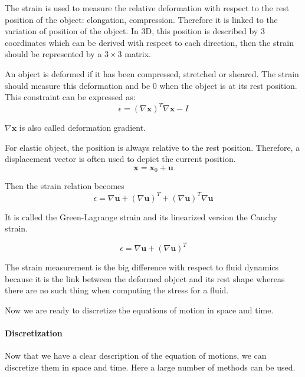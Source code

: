 \documentclass[11pt, oneside, a4paper]{memoir}
\begin{document}
The strain is used to measure the relative deformation with respect to the rest position of the object: elongation, compression. Therefore it is  linked to the variation of position of the object. In 3D, this position is described by 3 coordinates which can be derived with respect to each direction, then the strain should be represented by a $3\times3$ matrix.

An object is deformed if it has been compressed, stretched or sheared. The strain should measure this deformation and be $0$ when the object is at its rest position. This constraint can be expressed as:
\begin{equation}
\epsilon = \left( \nabla \mathbf{x} \right)^{T} \nabla \mathbf{x} - I
\end{equation}

$\nabla \mathbf{x}$ is also called deformation gradient.

For elastic object, the position is always relative to the rest position. Therefore, a displacement vector is often used to depict the current position.
\begin{equation}
\mathbf{x} = \mathbf{x}_{0} + \mathbf{u}
\end{equation}

Then the strain relation becomes
\begin{equation}
\epsilon = \nabla \mathbf{u} + \left( \nabla \mathbf{u} \right)^{T} + \left(\nabla \mathbf{u}\right)^{T}\nabla \mathbf{u}
\end{equation}

It is called the Green-Lagrange strain and its linearized version the Cauchy strain.

\begin{equation}
\epsilon = \nabla \mathbf{u} + \left( \nabla \mathbf{u} \right)^{T}
\end{equation}

The strain measurement is the big difference with respect to fluid dynamics because it is the link between the deformed object and its rest shape whereas there are no such thing when computing the stress for a fluid.

Now we are ready to discretize the equations of motion in space and time.

\paragraph{Discretization}

Now that we have a clear description of the equation of motions, we can discretize them in space and time. Here a large number of methods can be used. 
\end{document}

